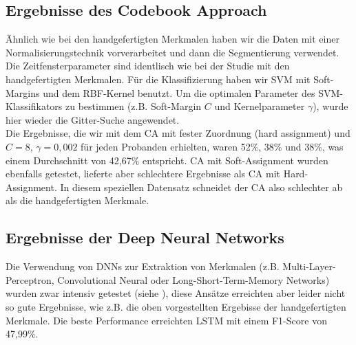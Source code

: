 \subsection{Ergebnisse des Codebook Approach} \label{ergebnisse-codebook-approach-subsec}


{\"A}hnlich wie bei den handgefertigten Merkmalen haben wir die Daten mit einer Normalisierungstechnik vorverarbeitet und dann die Segmentierung verwendet. Die Zeitfensterparameter sind identlisch wie bei der Studie mit den handgefertigten Merkmalen.
F{\"u}r die Klassifizierung haben wir SVM mit Soft-Margins und dem RBF-Kernel benutzt. 
Um die optimalen Parameter des SVM-Klassifikators zu bestimmen (z.B. Soft-Margin $C$ und Kernelparameter $\gamma$), wurde hier wieder die Gitter-Suche angewendet. \\


Die Ergebnisse, die wir mit dem CA mit fester Zuordnung (hard assignment) und $C = 8$, $\gamma = 0,002$ f{\"u}r jeden Probanden erhielten, waren 52\%, 38\% und 38\%, was einem Durchschnitt von 42,67\% entspricht. CA mit Soft-Assignment wurden ebenfalls getestet, lieferte aber schlechtere Ergebnisse als CA mit Hard-Assignment. In diesem speziellen Datensatz schneidet der CA also schlechter ab als die handgefertigten Merkmale.








\subsection{Ergebnisse der Deep Neural Networks} \label{ergebnisse-dnn}

Die Verwendung von DNNs zur Extraktion von Merkmalen (z.B. Multi-Layer-Perceptron, Convolutional Neural oder Long-Short-Term-Memory Networks) wurden zwar intensiv getestet (siehe \cite{bscschnieber18}), diese Ansätze erreichten aber leider nicht so gute Ergebnisse, wie z.B. die oben vorgestellten Ergebisse der handgefertigten Merkmale. Die beste Performance erreichten LSTM mit einem F1-Score von 47,99\%. \\
